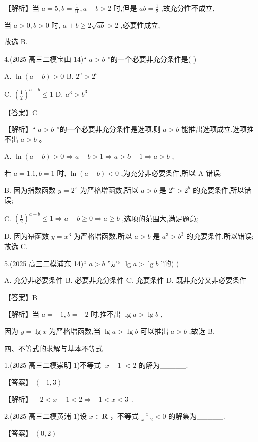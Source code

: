 \documentclass[10pt]{article}
\begin{document}
【解析】当 \(a = 5,b = \frac{1}{10},a + b > 2\) 时,但是 \({ab} = \frac{1}{2}\) ,故充分性不成立,

当 \(a > 0,b > 0\) 时, \(a + b \geq  2\sqrt{ab} > 2\) ,必要性成立,

故选 B.

4.(2025 高三二模宝山 14)“ \(a > b\) ”的一个必要非充分条件是( )

A. \(\ln \left( {a - b}\right)  > 0\) B. \({2}^{a} > {2}^{b}\)

C. \({\left( \frac{1}{2}\right) }^{a - b} \leq  1\) D. \({a}^{3} > {b}^{3}\)

【答案】C

【解析】“ \(a > b\) ”的一个必要非充分条件是选项,则 \(a > b\) 能推出选项成立,选项推不出 \(a > b\) 。

A. \(\ln \left( {a - b}\right)  > 0 \Rightarrow  a - b > 1 \Rightarrow  a > b + 1 \Rightarrow  a > b\) ,

若 \(a = {1.1},b = 1\) 时, \(\ln \left( {a - b}\right)  < 0\) ,为充分非必要条件,所以 \(\mathrm{A}\) 错误;

B. 因为指数函数 \(y = {2}^{x}\) 为严格增函数,所以 \(a > b\) 是 \({2}^{a} > {2}^{b}\) 的充要条件,所以错误;

C. \({\left( \frac{1}{2}\right) }^{a - b} \leq  1 \Rightarrow  a - b \geq  0 \Rightarrow  a \geq  b\) ,选项的范围大,满足题意;

D. 因为幂函数 \(y = {x}^{3}\) 为严格增函数,所以 \(a > b\) 是 \({a}^{3} > {b}^{3}\) 的充要条件,所以错误; 故选 C.

5.(2025 高三二模浦东 14)“ \(a > b\) ”是“ \(\lg a > \lg b\) ”的( )

A. 充分非必要条件 B. 必要非充分条件 C. 充要条件 D. 既非充分又非必要条件

【答案】B

【解析】当 \(a =  - 1,b =  - 2\) 时,推不出 \(\lg a > \lg b\) ,

因为 \(y = \lg x\) 为严格增函数,当 \(\lg a > \lg b\) 可以推出 \(a > b\) ,故选 B.

四、不等式的求解与基本不等式

1.(2025 高三二模崇明 1)不等式 \(\left| {x - 1}\right|  < 2\) 的解为\_\_\_\_\_.

【答案】 \(\left( {-1,3}\right)\)

【解析】 \(- 2 < x - 1 < 2 \Rightarrow   - 1 < x < 3\) .

2.(2025 高三二模黄浦 1)设 \(x \in  \mathbf{R}\) ，不等式 \(\frac{x}{x - 2} < 0\) 的解集为\_\_\_\_\_.

【答案】 \(\left( {0,2}\right)\)
\end{document}

